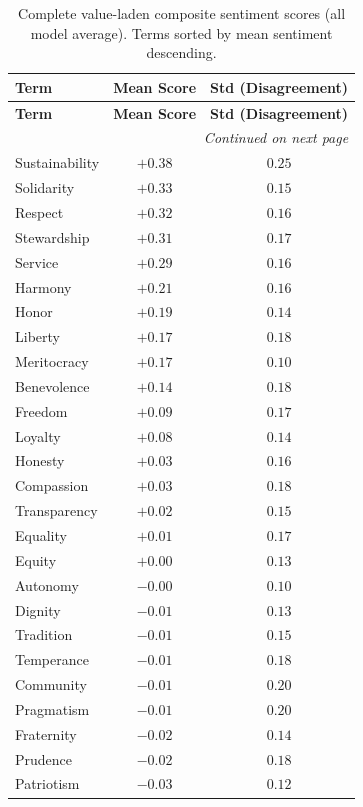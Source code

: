 \documentclass[11pt, letterpaper]{article}
\begin{document}
\begin{longtable}{lcc}
  \caption{Complete value-laden composite sentiment scores (all model average). Terms sorted by mean sentiment descending.}
  \label{tab:appendix_value_laden_composite_consensus} \\
  \toprule
  \textbf{Term} & \textbf{Mean Score} & \textbf{Std (Disagreement)} \\
  \midrule
  \endfirsthead
  \toprule
  \textbf{Term} & \textbf{Mean Score} & \textbf{Std (Disagreement)} \\
  \midrule
  \endhead
  \midrule
  \multicolumn{3}{r}{\textit{Continued on next page}} \\
  \endfoot
  \bottomrule
  \endlastfoot
  Sustainability & $+0.38$ & $0.25$ \\
  Solidarity & $+0.33$ & $0.15$ \\
  Respect & $+0.32$ & $0.16$ \\
  Stewardship & $+0.31$ & $0.17$ \\
  Service & $+0.29$ & $0.16$ \\
  Harmony & $+0.21$ & $0.16$ \\
  Honor & $+0.19$ & $0.14$ \\
  Liberty & $+0.17$ & $0.18$ \\
  Meritocracy & $+0.17$ & $0.10$ \\
  Benevolence & $+0.14$ & $0.18$ \\
  Freedom & $+0.09$ & $0.17$ \\
  Loyalty & $+0.08$ & $0.14$ \\
  Honesty & $+0.03$ & $0.16$ \\
  Compassion & $+0.03$ & $0.18$ \\
  Transparency & $+0.02$ & $0.15$ \\
  Equality & $+0.01$ & $0.17$ \\
  Equity & $+0.00$ & $0.13$ \\
  Autonomy & $-0.00$ & $0.10$ \\
  Dignity & $-0.01$ & $0.13$ \\
  Tradition & $-0.01$ & $0.15$ \\
  Temperance & $-0.01$ & $0.18$ \\
  Community & $-0.01$ & $0.20$ \\
  Pragmatism & $-0.01$ & $0.20$ \\
  Fraternity & $-0.02$ & $0.14$ \\
  Prudence & $-0.02$ & $0.18$ \\
  Patriotism & $-0.03$ & $0.12$ \\

\end{longtable}
\end{document}
